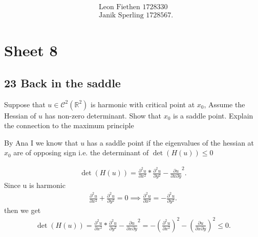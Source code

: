 
\begin{align*}
  &\text{Leon Fiethen 1728330}\\
 &\text{Janik Sperling 1728567}
.\end{align*}
\section*{Sheet 8}
\subsection*{23 Back in the saddle}
\begin{question}
Suppose that $u \in  \mathcal{C}^2(\mathbb{R}^{2} )$ is harmonic with 
critical point at $x_{0}$, Assume the Hessian of $u$ has non-zero determinant. Show 
that $x_{0}$ is a saddle point. Explain the connection
to the maximum principle  
\end{question}
By Ana I we know that $u$ has a saddle point if the eigenvalues of the hessian at $x_{0}$ are of opposing sign i.e.
the determinant of $\det(H(u))\le 0$
\begin{solution}
  \begin{align*}
    \det(H(u))  =  \frac{\partial ^2 u}{\partial x^2}*\frac{\partial ^2 u}{\partial y^2} - \frac{\partial u}{\partial x \partial y}^2
  .\end{align*}
  Since u is harmonic
  \begin{align*}
   \frac{\partial ^2 u }{\partial x^2} + \frac{\partial ^2 u }{\partial y ^2}  = 0 \implies \frac{\partial ^2 u }{\partial x^2} = -\frac{\partial ^2 u }{\partial y ^2}
  .\end{align*}
  then we get 
  \begin{align*}
    \det(H(u)) =   \frac{\partial ^2 u}{\partial x^2}*\frac{\partial ^2 u}{\partial y^2} - \frac{\partial u}{\partial x \partial y}^2 = - (\frac{\partial ^2 u}{\partial x^2})^2 -  (\frac{\partial u}{\partial x \partial y})^2  \le 0
  .\end{align*}
\end{solution}
\newpage
